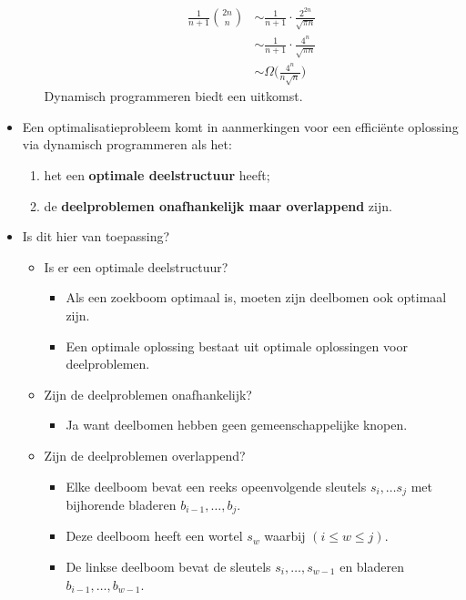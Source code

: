 \begin{itemize}
\begin{itemize}
        \begin{align*}
            \frac{1}{n + 1}\binom{2n}{n} & \sim \frac{1}{n + 1} \cdot \frac{2^{2n}}{\sqrt{\pi n}} \\
                                         & \sim \frac{1}{n + 1} \cdot \frac{4^{n}}{\sqrt{\pi n}} \\
                                         & \sim \Omega\bigg(\frac{4^n}{n\sqrt{n}}\bigg)
        \end{align*}
        \good Dynamisch programmeren biedt een uitkomst.
    \end{itemize}
    \item Een optimalisatieprobleem komt in aanmerkingen voor een efficiënte oplossing via dynamisch programmeren als het:
    \begin{enumerate}
        \item het een \textbf{optimale deelstructuur} heeft;
        \item de \textbf{deelproblemen onafhankelijk maar overlappend} zijn.
    \end{enumerate}
    \item Is dit hier van toepassing?
    \begin{itemize}
        \item Is er een optimale deelstructuur?
        \begin{itemize}
            \item Als een zoekboom optimaal is, moeten zijn deelbomen ook optimaal zijn.
            \item Een optimale oplossing bestaat uit optimale oplossingen voor deelproblemen.
        \end{itemize}
        \item Zijn de deelproblemen onafhankelijk?
        \begin{itemize}
            \item Ja want deelbomen hebben geen gemeenschappelijke knopen.
        \end{itemize}
        \item Zijn de deelproblemen overlappend?
        \begin{itemize}
            \item Elke deelboom bevat een reeks opeenvolgende sleutels $s_i, \dots s_j$ met bijhorende bladeren $b_{i - 1}, \dots, b_j$.
            \item Deze deelboom heeft een wortel $s_w$ waarbij $(i \leq w \leq j)$.
            \item De linkse deelboom bevat de sleutels $s_i, \dots, s_{w - 1}$ en bladeren $b_{i - 1}, \dots, b_{w - 1}$.

\end{itemize}
\end{itemize}
\end{itemize}
